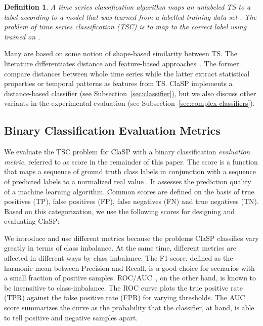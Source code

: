 \documentclass[pdflatex,sn-basic]{sn-jnl}
\newtheorem{definition}{Definition}
\begin{document}
\begin{definition}
A time series classification algorithm  maps an unlabeled TS  to a label  according to a model that was learned from a labelled training data set . The problem of time series classification (TSC) is to map  to the correct label  using  trained on .
\end{definition}

Many  are based on some notion of shape-based similarity between TS. The literature differentiates distance and feature-based approaches~\citep{bagnall2016great}. The former compare distances between whole time series while the latter extract statistical properties or temporal patterns as features from TS. ClaSP implements a distance-based classifier (see Subsection~\ref{sec:classifier}), but we also discuss other variants in the experimental evaluation (see Subsection~\ref{sec:complex-classifiers}). 


\subsection{Binary Classification Evaluation Metrics}
\label{sec:eval_metrics}

We evaluate the TSC problem for ClaSP with a binary classification \emph{evaluation metric}, referred to as score in the remainder of this paper. The score is a function that maps a sequence of  ground truth class labels  in conjunction with a sequence of  predicted labels  to a normalized real value . It assesses the prediction quality of a machine learning algorithm. Common scores are defined on the basis of true positives (TP), false positives (FP), false negatives (FN) and true negatives (TN). Based on this categorization, we use the following scores for designing and evaluating ClaSP:


We introduce and use different metrics because the problems ClaSP classifies vary greatly in terms of class imbalance. At the same time, different metrics are affected in different ways by class imbalance. The F1 score, defined as the harmonic mean between Precision and Recall, is a good choice for scenarios with a small fraction of positive samples. ROC/AUC~\citep{fawcett2006introduction}, on the other hand, is known to be insensitive to class-imbalance. The ROC curve plots the true positive rate (TPR) against the false positive rate (FPR) for varying thresholds. The AUC score summarizes the curve as the probability that the classifier, at hand, is able to tell positive and negative samples apart. 
\end{document}
